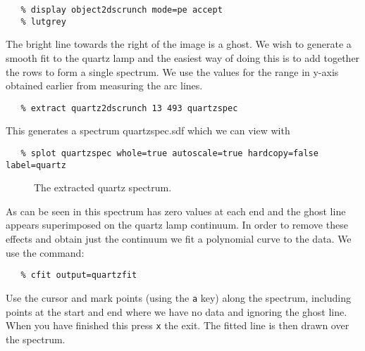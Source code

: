 {{{\scspec{\small}{ }
\begin{verbatim}
   % display object2dscrunch mode=pe accept
   % lutgrey 
\end{verbatim}
}

The bright line towards the right of the image is a ghost. We wish to generate a smooth fit to the quartz lamp and the easiest way of doing this is to add together the rows to form a single spectrum. We use the values for the range in y-axis obtained earlier from measuring the arc lines.

{\scspec{\small}{ }
\begin{verbatim}
   % extract quartz2dscrunch 13 493 quartzspec 
\end{verbatim}
}

This generates a spectrum quartzspec.sdf which we can view with 

{\scspec{\small}{ }
\begin{verbatim}
   % splot quartzspec whole=true autoscale=true hardcopy=false label=quartz
\end{verbatim}
}

\begin{figure}
\begin{center}
{\leavevmode\epsfysize=136mm}

\parbox{140mm}{
\caption{The extracted quartz spectrum.}
\label{quartzfit}
}
\end{center}
\end{figure}

As can be seen in  this spectrum has zero values at each end and the ghost line appears superimposed on the quartz lamp continuum. In order to remove these effects and obtain just the continuum we fit a polynomial curve to the data. We use the    command:

{\scspec{\small}{ }
\begin{verbatim}
   % cfit output=quartzfit
\end{verbatim}
}

Use the cursor and mark points (using the {\tt a} key) along the spectrum, including points at the start and end where we have no data and ignoring the ghost line.
When you have finished this press {\tt x} the exit. The fitted line is then drawn over the spectrum.



}}
